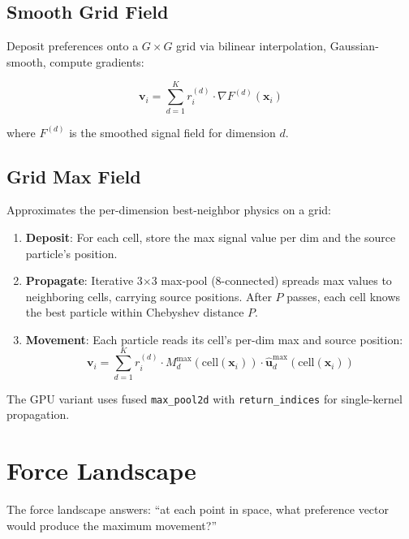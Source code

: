 \documentclass[11pt,a4paper]{article}
\begin{document}
\subsection{Smooth Grid Field}

Deposit preferences onto a $G \times G$ grid via bilinear interpolation, Gaussian-smooth, compute gradients:

\begin{equation}
\mathbf{v}_i = \sum_{d=1}^{K} r_i^{(d)} \cdot \nabla F^{(d)}(\mathbf{x}_i)
\end{equation}

where $F^{(d)}$ is the smoothed signal field for dimension $d$.

\subsection{Grid Max Field}

Approximates the per-dimension best-neighbor physics on a grid:

\begin{enumerate}[nosep]
\item \textbf{Deposit}: For each cell, store the max signal value per dim and the source particle's position.
\item \textbf{Propagate}: Iterative 3$\times$3 max-pool (8-connected) spreads max values to neighboring cells, carrying source positions. After $P$ passes, each cell knows the best particle within Chebyshev distance $P$.
\item \textbf{Movement}: Each particle reads its cell's per-dim max and source position:
\begin{equation}
\mathbf{v}_i = \sum_{d=1}^{K} r_i^{(d)} \cdot M_d^{\max}(\mathrm{cell}(\mathbf{x}_i)) \cdot \hat{\mathbf{u}}_d^{\max}(\mathrm{cell}(\mathbf{x}_i))
\end{equation}
\end{enumerate}

The GPU variant uses fused \texttt{max\_pool2d} with \texttt{return\_indices} for single-kernel propagation.

\section{Force Landscape}

The force landscape answers: ``at each point in space, what preference vector would produce the maximum movement?''
\end{document}
